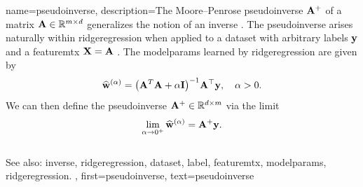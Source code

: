  
{name={pseudoinverse},
  description={The Moore–Penrose pseudoinverse ${\bf A}^{+}$ 
 	of a matrix ${\bf A} \in \mathbb{R}^{m \times d}$ generalizes the 
 	notion of an \gls{inverse} \cite{GolubVanLoanBook}. The pseudoinverse arises naturally 
 	within \gls{ridgeregression} when applied to a \gls{dataset} with arbitrary \glspl{label} ${\bf y}$ 
 	and a \gls{featuremtx} ${\bf X} = {\bf A}$ \cite[Ch.\ 3]{hastie01statisticallearning}. The \gls{modelparams} 
 	learned by \gls{ridgeregression} 
  	are given by
  	\[
  	\widehat{{\bf w}}^{(\alpha)}  = \big({\bf A}^T {\bf A} + \alpha \mathbf{I} \big)^{-1} {\bf A}^\top {\bf y}, \quad \alpha > 0.
  	\]
  	We can then define the pseudoinverse  ${\bf A}^+ \in \mathbb{R}^{d \times m}$ via 
  	the limit \cite[Ch. 3]{benisrael2003generalized}
  	\[
  	\lim_{\alpha \to 0^+} \widehat{{\bf w}}^{(\alpha)} = {\bf A}^+ {\bf y}.
  	\]
	\\
	See also: \gls{inverse}, \gls{ridgeregression}, \gls{dataset}, \gls{label}, \gls{featuremtx}, \gls{modelparams}, \gls{ridgeregression}.
	},
 first={pseudoinverse},
 text={pseudoinverse}
}

